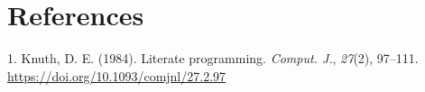 \documentclass[
  letterpaper,
  DIV=11,
  numbers=noendperiod]{scrreprt}
\newlength{\cslhangindent}
\newlength{\cslentryspacingunit} %
\newenvironment{CSLReferences}[2] %
 {%
  \setlength{\parindent}{0pt}
  \ifodd #1
  \let\oldpar\par
  \def\par{\hangindent=\cslhangindent\oldpar}
  \fi
  \setlength{\parskip}{#2\cslentryspacingunit}
 }%
 {}
\begin{document}
\noindent 


\hypertarget{references}{%
\chapter*{References}\label{references}}


\hypertarget{refs}{}
\begin{CSLReferences}{1}{0}
\leavevmode{}%
1. Knuth, D. E. (1984). Literate programming. \emph{Comput. J.},
\emph{27}(2), 97--111. \url{https://doi.org/10.1093/comjnl/27.2.97}

\end{CSLReferences}
\end{document}
